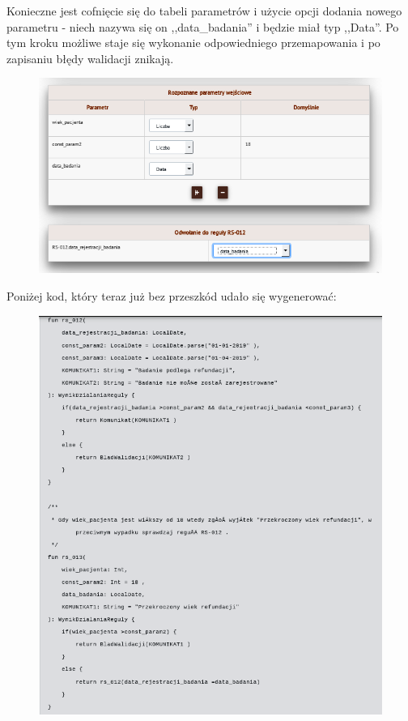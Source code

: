 Konieczne jest cofnięcie się do tabeli parametrów i użycie opcji dodania nowego parametru - niech nazywa się on ,,data\_badania'' i będzie miał typ ,,Data''. Po tym kroku możliwe staje się wykonanie odpowiedniego przemapowania i po zapisaniu błędy walidacji znikają.
\begin{figure}[H]
	\centering
	\includegraphics[scale=0.8]{img/app-eksperymenty/p4-5.png}
\end{figure}

Poniżej kod, który teraz już bez przeszkód udało się wygenerować:

\begin{figure}[H]
	\centering
	\includegraphics[scale=0.8]{img/app-eksperymenty/p4-6.png}
\end{figure}